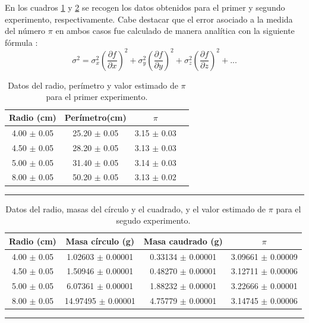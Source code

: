 \documentclass[10pt,a4paper]{article}
\begin{document}
\begin{multicols}{2}
		En los cuadros \ref{tab:primer exp} y \ref{tab:segundo exp} se recogen los datos obtenidos para el primer y segundo experimento, respectivamente. Cabe destacar que el error asociado a la medida del número $\pi$  en ambos casos fue calculado de manera analítica con la siguiente fórmula \cite{error}:
		\begin{equation}\label{errores}
		\sigma^2 = \sigma^2_x \left( \frac{\partial f}{\partial x} \right)^2 + \sigma^2_y \left( \frac{\partial f}{\partial y} \right)^2 + \sigma^2_z \left( \frac{\partial f}{\partial z} \right)^2+...
		\end{equation}
		\end{multicols}
		
			
		\begin{table}[H]
			\centering
			\begin{tabular}{|c|c|c|c|}
				\hline
				Radio (cm) & Perímetro(cm) &  $\pi$ \\ \hline
				4.00 $\pm$ 0.05  & 25.20 $\pm$ 0.05  & 3.15 $\pm$ 0.03 \\
				4.50 $\pm$ 0.05  & 28.20  $\pm$ 0.05 & 3.13 $\pm$ 0.03\\
				5.00 $\pm$ 0.05  & 31.40 $\pm$ 0.05 & 3.14 $\pm$ 0.03 \\ 
				8.00 $\pm$ 0.05  & 50.20 $\pm$ 0.05 & 3.13 $\pm$ 0.02\\ \hline
			\end{tabular}
			\caption{Datos del radio, perímetro y valor estimado de $\pi$ para el primer experimento.}
			\label{tab:primer exp}
			\rule{100mm}{0.1mm}
		\end{table}
		
		\begin{table}[H]
			\centering
			\begin{tabular}{|c|c|c|c|}
				\hline
				Radio (cm) & Masa círculo (g) & Masa caudrado (g) & $\pi$ \\ \hline
				4.00 $\pm$ 0.05  & 1.02603 $\pm$ 0.00001 & 0.33134 $\pm$ 0.00001 & 3.09661 $\pm$ 0.00009 \\
				4.50 $\pm$ 0.05  & 1.50946  $\pm$ 0.00001 & 0.48270 $\pm$ 0.00001 & 3.12711 $\pm$ 0.00006\\
				5.00 $\pm$ 0.05  & 6.07361 $\pm$ 0.00001 & 1.88232 $\pm$ 0.00001 & 3.22666 $\pm$ 0.00001 \\ 
				8.00 $\pm$ 0.05  & 14.97495 $\pm$ 0.00001 & 4.75779 $\pm$ 0.00001 & 3.14745 $\pm$ 0.00006\\ \hline
			\end{tabular}
			\caption{Datos del radio, masas del círculo y el cuadrado, y el valor estimado de $\pi$ para el segudo experimento.}
			\label{tab:segundo exp}
			\rule{100mm}{0.1mm}
		\end{table}
		
\end{document}
